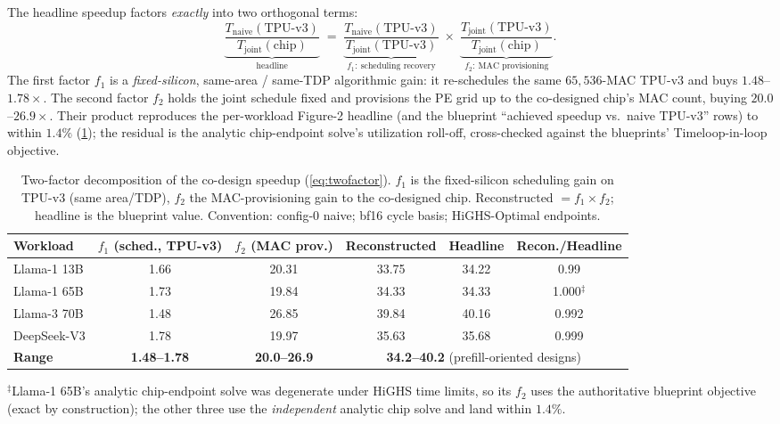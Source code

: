 The headline speedup factors \emph{exactly} into two orthogonal terms:
\begin{equation}
\underbrace{\frac{T_{\mathrm{naive}}(\text{TPU-v3})}{T_{\mathrm{joint}}(\text{chip})}}_{\text{headline}}
\;=\;
\underbrace{\frac{T_{\mathrm{naive}}(\text{TPU-v3})}{T_{\mathrm{joint}}(\text{TPU-v3})}}_{f_1:\ \text{scheduling recovery}}
\;\times\;
\underbrace{\frac{T_{\mathrm{joint}}(\text{TPU-v3})}{T_{\mathrm{joint}}(\text{chip})}}_{f_2:\ \text{MAC provisioning}} .
\label{eq:twofactor}
\end{equation}
The first factor $f_1$ is a \emph{fixed-silicon}, same-area / same-TDP algorithmic gain: it re-schedules the same $65{,}536$-MAC TPU-v3 and buys $\mathbf{1.48}$--$\mathbf{1.78\times}$.
The second factor $f_2$ holds the joint schedule fixed and provisions the PE grid up to the co-designed chip's MAC count, buying $\mathbf{20.0}$--$\mathbf{26.9\times}$.
Their product reproduces the per-workload Figure-2 headline (and the blueprint ``achieved speedup vs.\ naive TPU-v3'' rows) to within $1.4\%$ (\cref{tab:deficit_twofactor}); the residual is the analytic chip-endpoint solve's utilization roll-off, cross-checked against the blueprints' Timeloop-in-loop objective.

\begin{table}[ht!]
\centering
\caption{Two-factor decomposition of the co-design speedup
(\cref{eq:twofactor}).
$f_1$ is the fixed-silicon scheduling gain on TPU-v3
(same area/TDP), $f_2$ the MAC-provisioning gain to the co-designed chip.
Reconstructed $=f_1\times f_2$; headline is the blueprint value.
Convention:
config-0 naive; bf16 cycle basis; HiGHS-Optimal endpoints.}
\label{tab:deficit_twofactor}
\small
\begin{tabular}{@{}lccccc@{}}
\toprule
\textbf{Workload} & $f_1$ (sched., TPU-v3) & $f_2$ (MAC prov.)
& Reconstructed & Headline & Recon./Headline \\
\midrule
Llama-1 13B  & 1.66 & 20.31 & 33.75 & 34.22 & 0.99 \\
Llama-1 65B  & 1.73 & 19.84 & 34.33 & 34.33 & 1.000$^{\ddagger}$ \\
Llama-3 70B  & 1.48 & 26.85 & 39.84 & 40.16 & 0.992 \\
DeepSeek-V3  & 1.78 & 19.97 & 35.63 & 35.68 & 0.999 \\
\midrule
\textbf{Range} & \textbf{1.48--1.78} & \textbf{20.0--26.9}
& \multicolumn{3}{c}{\textbf{34.2--40.2} (prefill-oriented designs)} \\
\bottomrule
\end{tabular}

\vspace{2pt}
{\footnotesize $^{\ddagger}$Llama-1 65B's analytic chip-endpoint solve was
degenerate under HiGHS time limits, so its $f_2$ uses the authoritative
blueprint objective (exact by construction); the other three use the
\emph{independent} analytic chip solve and land within $1.4\%$.}
\end{table}

